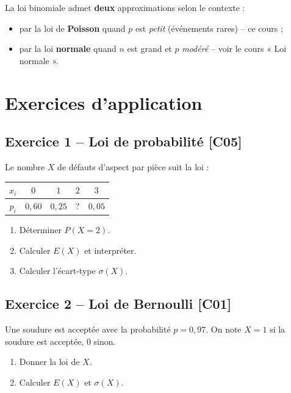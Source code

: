 \documentclass[a4paper,11pt]{article}
\begin{document}
\begin{remarque}
La loi binomiale admet \textbf{deux} approximations selon le contexte :
\begin{itemize}
  \item par la loi de \textbf{Poisson} quand $p$ est \emph{petit} (événements rares) -- ce cours ;
  \item par la loi \textbf{normale} quand $n$ est grand et $p$ \emph{modéré} -- voir le cours « Loi normale ».
\end{itemize}
\end{remarque}

\newpage
\section{Exercices d'application}

\subsection*{Exercice 1 -- Loi de probabilité \hfill {\normalsize\color{uimmred}[C05]}}
Le nombre $X$ de défauts d'aspect par pièce suit la loi :
\begin{center}
\renewcommand{\arraystretch}{1.3}
\begin{tabular}{|c|c|c|c|c|}
\hline
\rowcolor{uimmlightblue}
$x_i$ & $0$ & $1$ & $2$ & $3$ \\
\hline
$p_i$ & $0{,}60$ & $0{,}25$ & $?$ & $0{,}05$ \\
\hline
\end{tabular}
\end{center}
\begin{enumerate}[label=\alph*)]
  \item Déterminer $P(X = 2)$.
  \item Calculer $E(X)$ et interpréter.
  \item Calculer l'écart-type $\sigma(X)$.
\end{enumerate}

\subsection*{Exercice 2 -- Loi de Bernoulli \hfill {\normalsize\color{uimmred}[C01]}}
Une soudure est acceptée avec la probabilité $p = 0{,}97$. On note $X = 1$ si la soudure est acceptée, $0$ sinon.
\begin{enumerate}[label=\alph*)]
  \item Donner la loi de $X$.
  \item Calculer $E(X)$ et $\sigma(X)$.
\end{enumerate}
\end{document}
